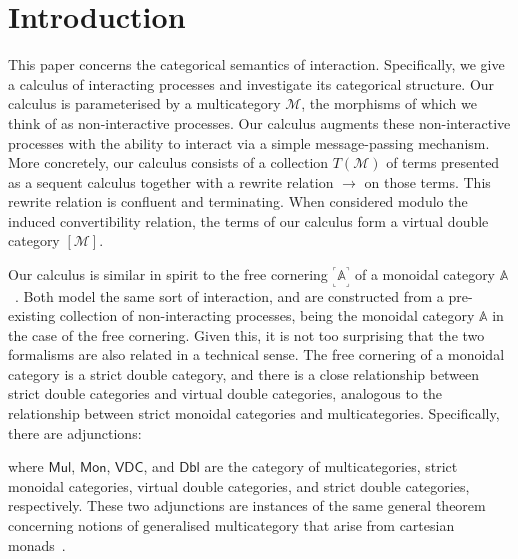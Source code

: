 \documentclass[twoside,11pt,final]{entics}
\newcommand{\corner}[1]{{\text{}^\ulcorner_\llcorner\!{#1}\!_\lrcorner^\urcorner}}
\begin{document}
\section{Introduction}\label{sec:intro}
This paper concerns the categorical semantics of interaction. Specifically, we give a calculus of interacting processes and investigate its categorical structure. Our calculus is parameterised by a multicategory $\mathcal{M}$, the morphisms of which we think of as non-interactive processes. Our calculus augments these non-interactive processes with the ability to interact via a simple message-passing mechanism. More concretely, our calculus consists of a collection $T(\mathcal{M})$ of terms presented as a sequent calculus together with a rewrite relation $\to$ on those terms. This rewrite relation is confluent and terminating. When considered modulo the induced convertibility relation, the terms of our calculus form a virtual double category $[\mathcal{M}]$.

Our calculus is similar in spirit to the free cornering $\corner{\mathbb{A}}$ of a monoidal category $\mathbb{A}$~\cite{Nester2021a,Nester2023}. Both model the same sort of interaction, and are constructed from a pre-existing collection of non-interacting processes, being the monoidal category $\mathbb{A}$ in the case of the free cornering. Given this, it is not too surprising that the two formalisms are also related in a technical sense. The free cornering of a monoidal category is a strict double category, and there is a close relationship between strict double categories and virtual double categories, analogous to the relationship between strict monoidal categories and multicategories. Specifically, there are adjunctions:
\begin{mathpar}
  
\end{mathpar}
where $\mathsf{Mul}$, $\mathsf{Mon}$, $\mathsf{VDC}$, and $\mathsf{Dbl}$ are the category of multicategories, strict monoidal categories, virtual double categories, and strict double categories, respectively. These two adjunctions are instances of the same general theorem concerning notions of generalised multicategory that arise from cartesian monads~\cite{Leinster2004}.
\end{document}
